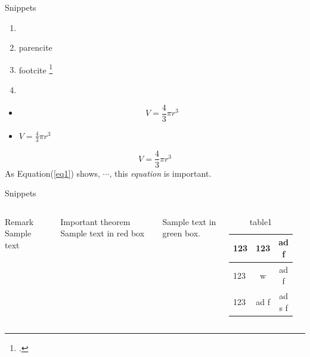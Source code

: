 \documentclass[UTF8, 16pt]{beamer}
\begin{document}
\begin{CJK*}{UTF8}{gbsn}

\begin{frame}{Snippets}
	\begin{multicols}{2}
		\begin{enumerate}
			\item \cite[Page10]{barro1990}
			\item parencite \\ \parencite{Greiner2008}
			\item footcite \footcite{green2020}
			\item \cite{Greiner2008}
		\end{enumerate}
		\begin{itemize}
			\item \[V = \frac{4}{3}\pi r^3\]
			\item $ V = \frac{4}{3}\pi r^3 $
		\end{itemize}
	\end{multicols}	
	\begin{equation}
		\label{eq1}
		V = \frac{4}{3}\pi r^3
	\end{equation}
	\center 
	As Equation(\ref{eq1}) shows, $\cdots$, this \emph{equation} is \alert{important}.
\end{frame}

\begin{frame}{Snippets}
	\begin{columns}
			\begin{block}{Remark}
				Sample text
			\end{block}
			\begin{alertblock}{Important theorem}
				Sample text in red box
			\end{alertblock}
			\begin{examples}
				Sample text in green box. 
			\end{examples}
			\begin{table}
			    \centering
			    \caption{table1}
			    \vspace{-0.5cm}
			    \setlength{\tabcolsep}{5mm}
				    {
				    \begin{tabular}{lcc}
				    \hline
			        123 & 123 & ad f \\ \hline
			        \textcolor{deepred}{123} & w & ad f \\ 
			        \textcolor{sufered}{123} & \alert{ad} f & ad s f \\ \hline
				    \end{tabular}
				    }
			    \label{fig1}
			\end{table}
	\end{columns}
\end{frame}
\end{CJK*}
\end{document}
